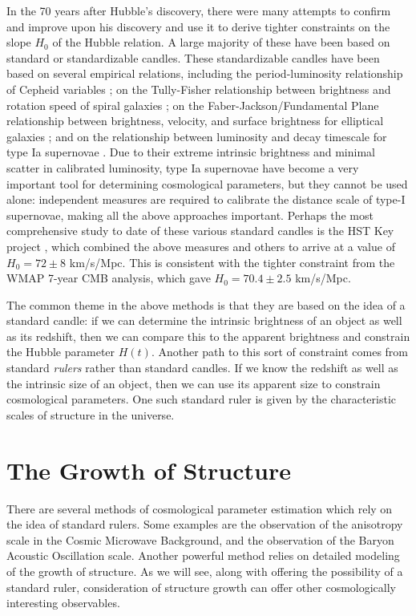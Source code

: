 In the 70 years after Hubble's discovery, there were many attempts to
confirm and improve upon his discovery and use it to derive tighter
constraints on the slope $H_0$ of the Hubble relation.  A large majority
of these have
been based on standard or standardizable candles.  These standardizable
candles have been based on several empirical relations, including
the period-luminosity relationship of Cepheid
variables \citep{Leavitt1912}; on the Tully-Fisher relationship between
brightness and rotation speed of spiral galaxies \citep{Tully77}; on
the Faber-Jackson/Fundamental Plane relationship between brightness,
velocity, and surface brightness for elliptical galaxies
\citep{Faber76, Djorgovski87}; and on the relationship between luminosity
and decay timescale for type Ia supernovae \citep{Philips93}.  Due to
their extreme intrinsic brightness and minimal scatter in
calibrated luminosity, type Ia supernovae have become a very important
tool for determining cosmological parameters, but they cannot be used
alone: independent measures are required to calibrate the distance
scale of type-I supernovae, making all the above approaches important.
Perhaps the most comprehensive study to date of these various standard
candles is the HST Key project \citep{Freedman01}, which combined
the above measures and others to arrive
at a value of $H_0 = 72 \pm 8$ km/s/Mpc.  This is consistent with the
tighter constraint from the WMAP 7-year CMB analysis, which gave
$H_0 = 70.4 \pm 2.5$ km/s/Mpc.

The common theme in the above methods is that they are based on the idea
of a standard candle: if we can determine the intrinsic brightness
of an object as well as its redshift, then we can compare this to the
apparent brightness and constrain the Hubble parameter $H(t)$.
Another path to this sort of constraint comes from standard {\it rulers}
rather than standard candles.  If we know the redshift as well as the
intrinsic size of an object, then we can use its apparent size to
constrain cosmological parameters.  One such standard ruler is given by the
characteristic scales of structure in the universe.

\section{The Growth of Structure}
\label{sec:growth}
There are several methods of cosmological parameter estimation which rely
on the idea of standard rulers.  Some examples are the observation of the
anisotropy scale in the Cosmic Microwave Background, and the observation
of the Baryon Acoustic Oscillation scale.
Another powerful method relies on detailed modeling of the growth of structure.
As we will see, along with offering the possibility of a standard ruler,
consideration of structure growth can offer other cosmologically interesting
observables.

